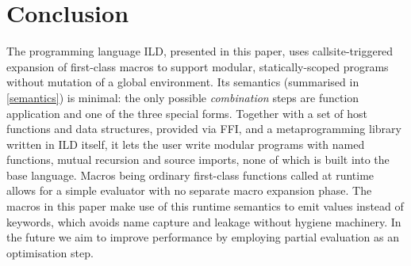 \section{Conclusion}
The programming language ILD, presented in this paper, uses callsite-triggered
expansion of first-class macros to support modular, statically-scoped programs
without mutation of a global environment. Its semantics (summarised in
\cref{semantics}) is minimal: the only possible \emph{combination}
steps are function application and one of the three special forms. Together
with a set of host functions and data structures, provided via FFI, and a
metaprogramming library written in ILD itself, it lets the user write modular
programs with named functions, mutual recursion and source imports, none of
which is built into the base language. Macros being ordinary first-class
functions called at runtime allows for a simple evaluator with no separate
macro expansion phase. The macros in this paper make use of this runtime
semantics to emit values instead of keywords, which avoids name capture and
leakage without hygiene machinery. In the future we aim to improve performance
by employing partial evaluation as an optimisation step.
